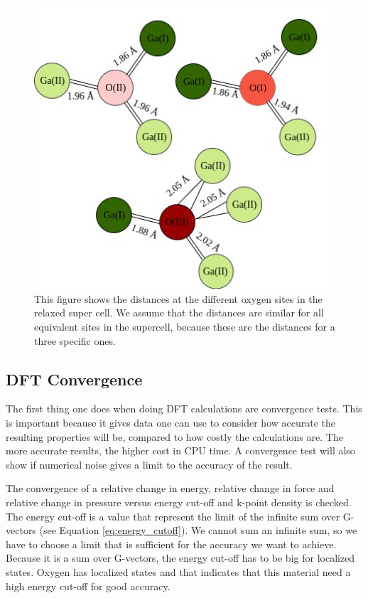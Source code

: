\begin{figure}[H]
\includegraphics[width=\linewidth]{../fig/distances}\caption{This figure shows the distances at the different oxygen sites in the relaxed super cell. We assume that the distances are similar for all equivalent sites in the supercell, because these are the distances for a three specific ones.}\label{fig:distances}
\end{figure}

\subsection{DFT Convergence}

The first thing one does when doing DFT calculations are convergence tests. This is important because it gives data one can use to consider how accurate the resulting properties will be, compared to how costly the calculations are. The more accurate results, the higher cost in CPU time. A convergence test will also show if numerical noise gives a limit to the accuracy of the result.

The convergence of a relative change in energy, relative change in force and relative change in pressure versus energy cut-off and k-point density is checked. The energy cut-off is a value that represent the limit of the infinite sum over G-vectors (see Equation \ref{eq:energy_cutoff}). We cannot sum an infinite sum, so we have to choose a limit that is sufficient for the accuracy we want to achieve. Because it is a sum over G-vectors, the energy cut-off has to be big for localized states. Oxygen has localized states and that indicates that this material need a high energy cut-off for good accuracy. 

